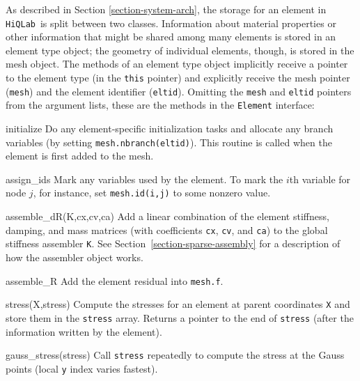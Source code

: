 \documentclass{article}
\newcommand{\hiq}{\texttt{HiQLab}}
\newenvironment{codelist}[1][\quad]%
  {\begin{list}{}{%
   \settowidth{\labelwidth}{\texttt{#1}\hfil}%
   \setlength{\leftmargin}{\labelwidth}%
   \addtolength{\leftmargin}{\labelsep}%
   \addtolength{\leftmargin}{\parindent}%
   \renewcommand{\makelabel}[1]{\texttt{##1}}}}%
  {\end{list}}
\newcommand{\ttt}[1]{\texttt{#1}}
\begin{document}
As described in Section \ref{section-system-arch}, the storage for an
element in \hiq\ is split between two classes.  Information about
material properties or other information that might be shared among
many elements is stored in an element type object; the geometry of
individual elements, though, is stored in the mesh object.  The
methods of an element type object implicitly receive a pointer to the
element type (in the \ttt{this} pointer) and explicitly receive the
mesh pointer (\ttt{mesh}) and the element identifier
(\ttt{eltid}).  Omitting the \ttt{mesh} and \ttt{eltid}
pointers from the argument lists, these are the methods in the
\ttt{Element} interface:
\begin{codelist}

  \item[initialize]
    Do any element-specific initialization tasks and allocate any
    branch variables (by setting \ttt{mesh.nbranch(eltid)}).  This
    routine is called when the element is first added to the mesh.

  \item[assign\_ids]
    Mark any variables used by the element.  To mark the $i$th
    variable for node $j$, for instance, set \ttt{mesh.id(i,j)} to
    some nonzero value.

  \item[assemble\_dR(K,cx,cv,ca)]
    Add a linear combination of the element stiffness, damping, and
    mass matrices (with coefficients \ttt{cx}, \ttt{cv}, and
    \ttt{ca}) to the global stiffness assembler \ttt{K}.
    See Section~\ref{section-sparse-assembly} for a description of how
    the assembler object works.

  \item[assemble\_R]
    Add the element residual into \ttt{mesh.f}.

  \item[stress(X,stress)] 
    Compute the stresses for an element at parent coordinates
    \ttt{X} and store them in the \ttt{stress} array.  Returns
    a pointer to the end of \ttt{stress} (after the information
    written by the element).

  \item[gauss\_stress(stress)]
    Call \ttt{stress} repeatedly to compute the stress at the Gauss
    points (local \ttt{y} index varies fastest).

\end{codelist}

\end{document}
